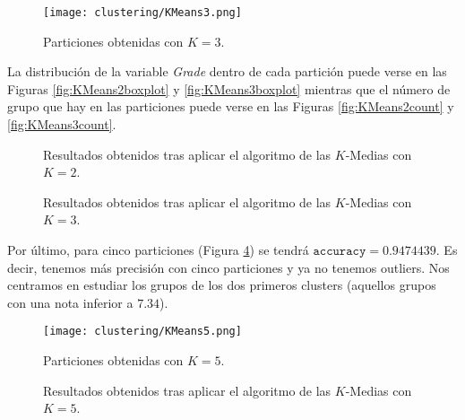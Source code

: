 \begin{figure}[H]
    \centering
    \texttt{[image: clustering/KMeans3.png]}
    \caption{Particiones obtenidas con $K = 3$.}
    \label{fig:KMeans3}
\end{figure}

La distribución de la variable \emph{Grade} dentro de cada partición puede verse en las Figuras \ref{fig:KMeans2boxplot} y \ref{fig:KMeans3boxplot} mientras que el número de grupo que hay en las particiones puede verse en las Figuras \ref{fig:KMeans2count} y \ref{fig:KMeans3count}.

\begin{figure}[H]
\centering
{}\qquad
{}%
\caption{Resultados obtenidos tras aplicar el algoritmo de las $K$-Medias con $K = 2$.}
\label{fig:KMeans2details}
\end{figure}

\begin{figure}[H]
\centering
{}\qquad
{}%
\caption{Resultados obtenidos tras aplicar el algoritmo de las $K$-Medias con $K = 3$.}
\label{fig:KMeans3details}
\end{figure}

Por último, para cinco particiones (Figura \ref{fig:KMeans5}) se tendrá $\texttt{accuracy} = 0.9474439$. Es decir, tenemos más precisión con cinco particiones y ya no tenemos outliers. Nos centramos en estudiar los grupos de los dos primeros clusters (aquellos grupos con una nota inferior a $7.34$).

\begin{figure}[H]
    \centering
    \texttt{[image: clustering/KMeans5.png]}
    \caption{Particiones obtenidas con $K = 5$.}
    \label{fig:KMeans5}
\end{figure}

\begin{figure}[H]
\centering
{}\qquad
{}%
\caption{Resultados obtenidos tras aplicar el algoritmo de las $K$-Medias con $K = 5$.}
\label{fig:KMeans5details}
\end{figure}

